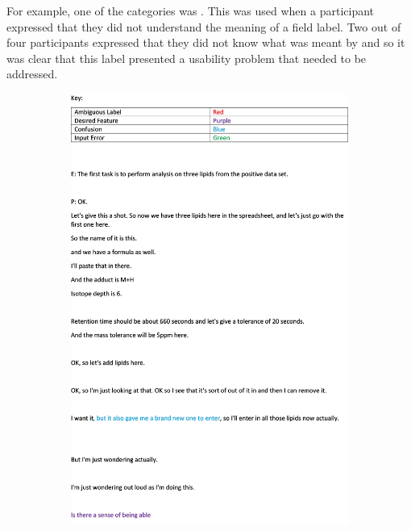 \documentclass{l4proj}
\begin{document}
For example, one of the categories was . This was used when a participant expressed that they did not understand the meaning of a field label. Two out of four participants expressed that they did not know what was meant by  and so it was clear that this label presented a usability problem that needed to be addressed.

\begin{figure}[htb]
    \begin{subfigure}{0.5\textwidth}
        \centering
        \includegraphics[width=\textwidth]{dissertation/images/transcript_page_1.png}    
        \label{fig:final} 
    \end{subfigure}
        \begin{subfigure}{0.5\textwidth}

\end{subfigure}
\end{figure}
\end{document}
